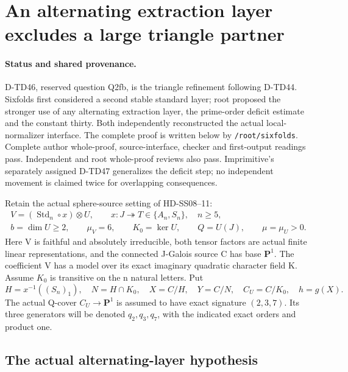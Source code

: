 \section{An alternating extraction layer excludes a large triangle partner}
\label{sec:standard-triangle-alternating-layer}

\paragraph{Status and shared provenance.}
D-TD46, reserved question Q2fb, is the triangle refinement following
D-TD44. Sixfolds first considered a second stable standard layer;
root proposed the stronger use of any alternating extraction layer,
the prime-order deficit estimate and the constant thirty. Both
independently reconstructed the actual local-normalizer interface.
The complete proof is written below by \texttt{/root/sixfolds}.
Complete author whole-proof, source-interface, checker and first-output
readings pass. Independent and root whole-proof reviews also pass.
Imprimitive's separately assigned D-TD47 generalizes the deficit step;
no independent movement is claimed twice for overlapping consequences.

Retain the actual sphere-source setting of HD-SS08--11:
\[
 \begin{gathered}
 V=(\operatorname{Std}_n\circ x)\otimes U,\qquad
 x:J\twoheadrightarrow T\in\{A_n,S_n\},\quad n\ge5,\\
 b=\dim U\ge2,\qquad \mu_V=6,\qquad
 K_0=\ker U,\qquad Q=U(J),\qquad \mu=\mu_U>0.
 \end{gathered}
 \tag{SAT.1}
\]
Here V is faithful and absolutely irreducible, both tensor factors
are actual finite linear representations, and the connected
J-Galois source C has base \(\mathbf P^1\). The coefficient V has
a model over its exact imaginary quadratic character field K.
Assume \(K_0\) is transitive on the n natural letters. Put
\[
 H=x^{-1}((S_n)_1),\quad N=H\cap K_0,\quad
 X=C/H,\quad Y=C/N,\quad C_U=C/K_0,\quad h=g(X).
 \tag{SAT.2}
\]
The actual Q-cover \(C_U\to\mathbf P^1\) is assumed to have
exact signature \((2,3,7)\). Its three generators will be denoted
\(q_2,q_3,q_7\), with the indicated exact orders and product one.

\subsection*{The actual alternating-layer hypothesis}

